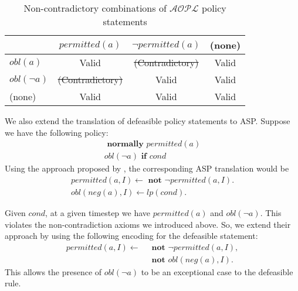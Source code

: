 \begin{table}[h]
    \centering
    \begin{tabular}{ | l | c | c | c | }
        \hline
        & $permitted(a)$ & $\neg permitted(a)$ & (none) \\
        \hline
        $obl(a)$ & Valid & \sout{(Contradictory)} & Valid \\
        \hline
        $obl(\neg a)$ & \sout{(Contradictory)} & Valid & Valid \\
        \hline
        (none) & Valid & Valid & Valid \\
        \hline
    \end{tabular}
    \caption{Non-contradictory combinations of $\mathcal{AOPL}$ policy statements}
    \label{table:apia_non_contradiction}
\end{table}

We also extend the translation of defeasible policy statements to ASP.
Suppose we have the following policy:
\begin{gather}
    \textbf{ normally } permitted(a) \\
    obl(\neg a) \textbf{ if } cond
\end{gather}
Using the approach proposed by \citet{gelfond_authorization_2008}, the corresponding ASP translation would be
\begin{gather}
    permitted(a, I) \leftarrow \textbf{ not } \neg permitted(a, I). \\
    obl(neg(a), I) \leftarrow lp(cond).
\end{gather}

Given $cond$, at a given timestep we have $permitted(a)$ and $obl(\neg a)$.
This violates the non-contradiction axioms we introduced above.
So, we extend their approach by using the following encoding for the defeasible statement:
\begin{equation}
\begin{split}
    permitted(a, I) \leftarrow \
        & \textbf{ not } \neg permitted(a, I), \\
        & \textbf{ not } obl(neg(a), I).
\end{split}
\end{equation}
This allows the presence of $obl(\neg a)$ to be an exceptional case to the defeasible rule.

